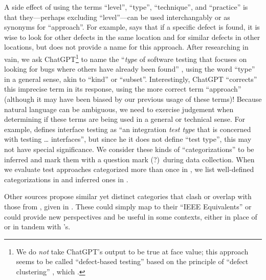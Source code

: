 A side effect of using the terms ``level'', ``type'', ``technique'', and
``practice'' is that they---perhaps excluding ``level''---can
be used interchangably or as synonyms for ``approach''. For example,
\citet[p.~88]{Patton2006} says that if a specific defect is found, it is wise
to look for other defects in the same location and for similar defects in other
locations, but does not provide a name for this approach. After researching in
vain, we ask ChatGPT\footnote{We do \emph{not} take ChatGPT's output to be
    true at face value; this approach seems to be called ``defect-based
    testing'' based on the principle of ``defect clustering''
    \citep{ChatGPT2024}, which \citet{RusEtAl2008} .}
to name the ``\emph{type} of software testing that focuses on looking for bugs
where others have already been found''
\ifnotpaper \citep[emphasis added]{ChatGPT2024}\else \cite{ChatGPT2024}\fi%
,
using the word ``type'' in a general sense, akin to ``kind'' or ``subset''.
Interestingly, ChatGPT ``corrects'' this imprecise term in its response,
using the more correct term ``approach'' (although it may have been biased by
our previous usage of these terms)! Because natural language can be ambiguous,
we need to exercise judgement when determining if these terms are being used
in a general or technical sense. For example,
\citet[p.~45\ifnotpaper, emphasis added\fi]{Kam2008}
defines interface testing as ``an integration \emph{test type} that is
concerned with testing \dots{} interfaces'', but since \ifnotpaper he \else it
\fi does not define ``test type'', this may not have special significance.
\ifnotpaper We consider these kinds of ``categorizations'' to be
    inferred and mark them with a question mark (?)~during data collection.
    When we evaluate test approaches categorized more than once in
    , we list well-defined categorizations in
     and inferred ones in .

    Other sources \citep[such as][]{SWEBOK2024,BarbosaEtAl2006}
    propose similar yet distinct categories that clash or overlap with those
    from \citep{IEEE2022}, given in . These could simply map
    to their ``IEEE Equivalents'' or could provide new perspectives and be
    useful in some contexts, either in place of or in tandem with
    \citet{IEEE2022}'s.

    \begin{landscape}
        \otherCatsTable{}
    \end{landscape}

